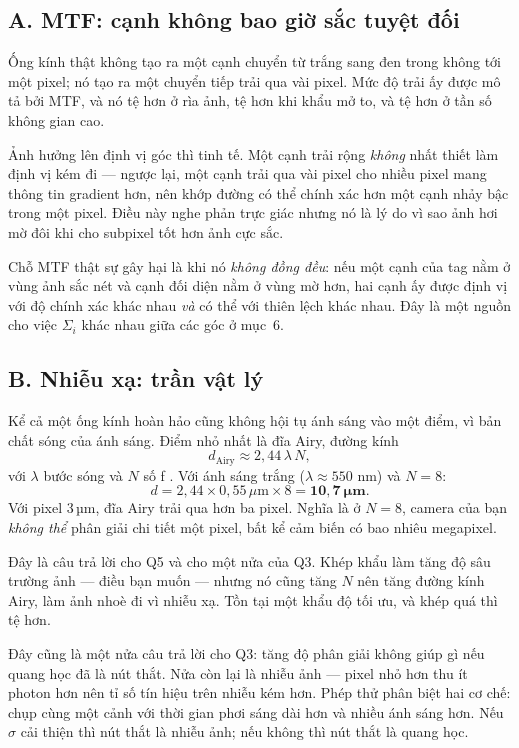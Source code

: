 \documentclass[../../marker.tex]{subfiles}
\begin{document}
\subsection{A. MTF: cạnh không bao giờ sắc tuyệt đối}

Ống kính thật không tạo ra một cạnh chuyển từ trắng sang đen trong không tới một pixel; nó tạo ra một chuyển tiếp trải qua vài pixel. Mức độ trải ấy được mô tả bởi MTF, và nó tệ hơn ở rìa ảnh, tệ hơn khi khẩu mở to, và tệ hơn ở tần số không gian cao.

Ảnh hưởng lên định vị góc thì tinh tế. Một cạnh trải rộng \emph{không} nhất thiết làm định vị kém đi --- ngược lại, một cạnh trải qua vài pixel cho nhiều pixel mang thông tin gradient hơn, nên khớp đường có thể chính xác hơn một cạnh nhảy bậc trong một pixel. Điều này nghe phản trực giác nhưng nó là lý do vì sao ảnh hơi mờ đôi khi cho subpixel tốt hơn ảnh cực sắc.

Chỗ MTF thật sự gây hại là khi nó \emph{không đồng đều}: nếu một cạnh của tag nằm ở vùng ảnh sắc nét và cạnh đối diện nằm ở vùng mờ hơn, hai cạnh ấy được định vị với độ chính xác khác nhau \emph{và} có thể với thiên lệch khác nhau. Đây là một nguồn cho việc \(\Sigma_i\) khác nhau giữa các góc ở  mục~6.

\subsection{B. Nhiễu xạ: trần vật lý}

Kể cả một ống kính hoàn hảo cũng không hội tụ ánh sáng vào một điểm, vì bản chất sóng của ánh sáng. Điểm nhỏ nhất là đĩa Airy, đường kính
\[
d_{\text{Airy}} \approx 2{,}44\,\lambda\,N,
\]
với \(\lambda\) bước sóng và \(N\) số f \cite{goodman2005fourier}. Với ánh sáng trắng (\(\lambda \approx 550\) nm) và \(N = 8\):
\[
d = 2{,}44 \times 0{,}55\,\mu\text{m} \times 8 = \mathbf{10{,}7\ \mu\text{m}}.
\]
Với pixel 3\,µm, đĩa Airy trải qua hơn ba pixel. Nghĩa là ở \(N = 8\), camera của bạn \emph{không thể} phân giải chi tiết một pixel, bất kể cảm biến có bao nhiêu megapixel.

Đây là câu trả lời cho Q5 và cho một nửa của Q3. Khép khẩu làm tăng độ sâu trường ảnh --- điều bạn muốn --- nhưng nó cũng tăng \(N\) nên tăng đường kính Airy, làm ảnh nhoè đi vì nhiễu xạ. Tồn tại một khẩu độ tối ưu, và khép quá thì tệ hơn.

Đây cũng là một nửa câu trả lời cho Q3: tăng độ phân giải không giúp gì nếu quang học đã là nút thắt. Nửa còn lại là nhiễu ảnh --- pixel nhỏ hơn thu ít photon hơn nên tỉ số tín hiệu trên nhiễu kém hơn. Phép thử phân biệt hai cơ chế: chụp cùng một cảnh với thời gian phơi sáng dài hơn và nhiều ánh sáng hơn. Nếu \(\sigma\) cải thiện thì nút thắt là nhiễu ảnh; nếu không thì nút thắt là quang học.
\end{document}
